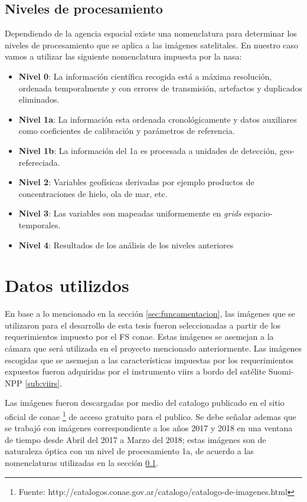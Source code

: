 \subsection{Niveles de procesamiento}\label{sub:nivelesdeprocesamiento}
Dependiendo de la agencia espacial existe una nomenclatura para determinar los niveles de procesamiento que se aplica a las imágenes satelitales. En nuestro caso vamos a utilizar las siguiente nomenclatura impuesta por la \ac{nasa}:
\begin{itemize}
	\item \textbf{Nivel 0}: La información científica recogida está a máxima resolución, ordenada temporalmente y con errores de transmisión, artefactos y duplicados eliminados.
 	\item \textbf{Nivel 1a}: La información esta ordenada cronológicamente y datos auxiliares como coeficientes de calibración y parámetros de referencia.
 	\item \textbf{Nivel 1b}: La información del 1a es procesada a unidades de detección, geo-refereciada.
 	\item \textbf{Nivel 2}: Variables geofísicas derivadas por ejemplo productos de concentraciones de hielo, ola de mar, etc.
 	\item \textbf{Nivel 3}: Las variables son mapeadas uniformemente en \textit{grids} espacio-temporales.
 	\item \textbf{Nivel 4}: Resultados de los análisis de los niveles anteriores
\end{itemize}


\section{Datos utilizdos}\label{sec:datosutilizados}

En base a lo mencionado en la sección \ref{sec:funcamentacion}, las imágenes que se utilizaron para el desarrollo de esta tesis fueron seleccionadas a partir de los requerimientos impuesto por el \ac{FS} \ac{conae}. Estas imágenes se asemejan a la cámara que será utilizada en el proyecto mencionado anteriormente. Las imágenes escogidas que se asemejan a las características impuestas por los requerimientos expuestos fueron adquiridas por el instrumento \ac{viirs} a bordo del satélite Suomi-NPP \ref{sub:viirs}.

Las imágenes fueron descargadas por medio del catalogo  publicado en el sitio oficial de \ac{conae} \footnote{Fuente: http://catalogos.conae.gov.ar/catalogo/catalogo-de-imagenes.html} de acceso gratuito para el publico. Se debe señalar ademas que se trabajó con imágenes correspondiente a los años 2017 y 2018 en una ventana de tiempo desde Abril del 2017 a Marzo del 2018; estas imágenes son de naturaleza óptica con un nivel de procesamiento 1a, de acuerdo a las nomenclaturas utilizadas en la sección \ref{sub:nivelesdeprocesamiento}.



